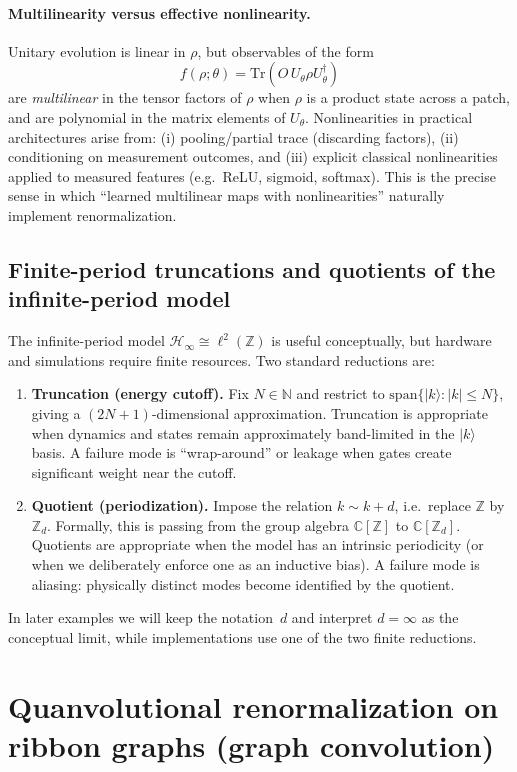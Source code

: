 \documentclass[11pt,oneside]{amsbook}
\numberwithin{equation}{section}
\theoremstyle{plain}
\theoremstyle{definition}
\theoremstyle{remark}
\newcommand{\ket}[1]{\lvert #1 \rangle}
\begin{document}
\paragraph{Multilinearity versus effective nonlinearity.}
Unitary evolution is linear in $\rho$, but observables of the form
\[
  f(\rho;\theta)=\mathrm{Tr}\!\left(O\,U_\theta \rho U_\theta^\dagger\right)
\]
are \emph{multilinear} in the tensor factors of $\rho$ when $\rho$ is a product state across a
patch, and are polynomial in the matrix elements of $U_\theta$.
Nonlinearities in practical architectures arise from:
(i) pooling/partial trace (discarding factors), (ii) conditioning on measurement outcomes, and
(iii) explicit classical nonlinearities applied to measured features (e.g.\ ReLU, sigmoid, softmax).
This is the precise sense in which ``learned multilinear maps with nonlinearities'' naturally
implement renormalization.

\subsection{Finite-period truncations and quotients of the infinite-period model}
The infinite-period model $\mathcal{H}_\infty \cong \ell^2(\mathbb{Z})$ is useful conceptually,
but hardware and simulations require finite resources.
Two standard reductions are:
\begin{enumerate}
\item \textbf{Truncation (energy cutoff).} Fix $N\in\mathbb{N}$ and restrict to
$\mathrm{span}\{\ket{k}: |k|\le N\}$, giving a $(2N+1)$-dimensional approximation.
Truncation is appropriate when dynamics and states remain approximately band-limited in the
$\ket{k}$ basis. A failure mode is ``wrap-around'' or leakage when gates create significant weight
near the cutoff.
\item \textbf{Quotient (periodization).} Impose the relation $k\sim k+d$, i.e.\ replace
$\mathbb{Z}$ by $\mathbb{Z}_d$. Formally, this is passing from the group algebra
$\mathbb{C}[\mathbb{Z}]$ to $\mathbb{C}[\mathbb{Z}_d]$. Quotients are appropriate when the model
has an intrinsic periodicity (or when we deliberately enforce one as an inductive bias).
A failure mode is aliasing: physically distinct modes become identified by the quotient.
\end{enumerate}
In later examples we will keep the notation~$d$ and interpret $d=\infty$ as the conceptual limit,
while implementations use one of the two finite reductions.

\section{Quanvolutional renormalization on ribbon graphs (graph convolution)}
\label{sec:graph_quanv}
\end{document}
